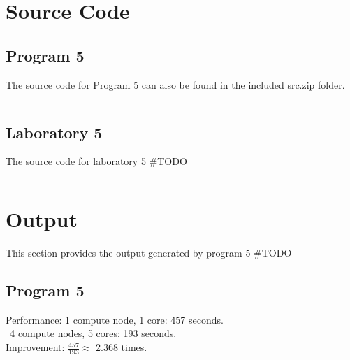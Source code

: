 \documentclass{article}
\begin{document}
\pagebreak
	
	\section{Source Code} \label{SRC}
		\subsection{Program 5} \label{P5_SRC}
		The source code for Program 5 can also be found in the included src.zip folder.\\

				\begin{lstlisting}

				\end{lstlisting}
	
		\subsection{Laboratory 5} \label{L5_SRC}
			The source code for laboratory 5 \#TODO\\
			\begin{lstlisting}

			\end{lstlisting}
	
	\section{Output} \label{OUT}
		This section provides the output generated by program 5 \#TODO\\
		
		\subsection{Program 5} \label{P5_OUT}
			Performance: 1 compute node, 1 core: 457 seconds.\\
			\indent\indent\indent\indent $\phantom{:}$4 compute nodes, 5 cores: 193 seconds.\\
			Improvement: $\frac{457}{193} \approx $ 2.368 times.\\
		
\end{document}
